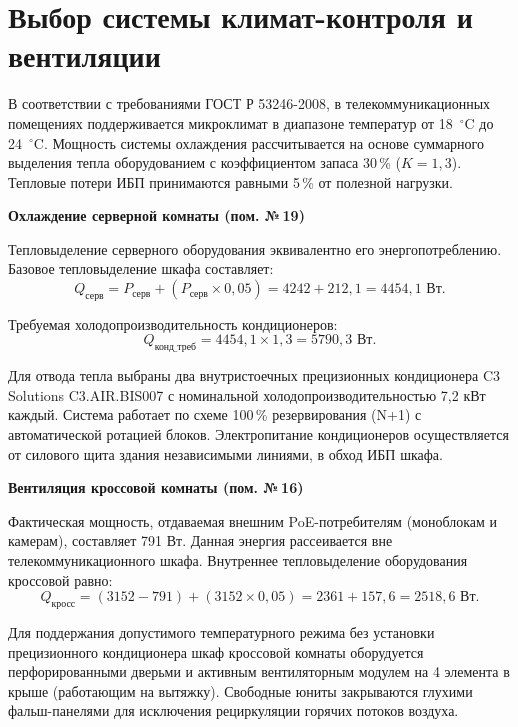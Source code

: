 \documentclass[a4paper,oneside,14pt]{extreport}
\begin{document}
\section{Выбор системы климат-контроля и вентиляции}

В соответствии с требованиями ГОСТ Р 53246-2008, в телекоммуникационных помещениях поддерживается микроклимат в диапазоне температур от 18~$^\circ$C до 24~$^\circ$C. Мощность системы охлаждения рассчитывается на основе суммарного выделения тепла оборудованием с коэффициентом запаса 30\,\% ($K = 1{,}3$). Тепловые потери ИБП принимаются равными 5\,\% от полезной нагрузки.

\textbf{Охлаждение серверной комнаты (пом. №\,19)}

Тепловыделение серверного оборудования эквивалентно его энергопотреблению. Базовое тепловыделение шкафа составляет:
\begin{equation}
    Q_{\text{серв}} = P_{\text{серв}} + (P_{\text{серв}} \times 0{,}05) = 4242 + 212{,}1 = 4454{,}1 \text{ Вт}.
\end{equation}

Требуемая холодопроизводительность кондиционеров:
\begin{equation}
    Q_{\text{конд\_треб}} = 4454{,}1 \times 1{,}3 = 5790{,}3 \text{ Вт}.
\end{equation}

Для отвода тепла выбраны два внутристоечных прецизионных кондиционера C3 Solutions C3.AIR.BIS007 с номинальной холодопроизводительностью 7{,}2 кВт каждый. Система работает по схеме 100\,\% резервирования (N+1) с автоматической ротацией блоков. Электропитание кондиционеров осуществляется от силового щита здания независимыми линиями, в обход ИБП шкафа.

\textbf{Вентиляция кроссовой комнаты (пом. №\,16)}

Фактическая мощность, отдаваемая внешним PoE-потребителям (моноблокам и камерам), составляет 791 Вт. Данная энергия рассеивается вне телекоммуникационного шкафа. 
Внутреннее тепловыделение оборудования кроссовой равно:
\begin{equation}
    Q_{\text{кросс}} = (3152 - 791) + (3152 \times 0{,}05) = 2361 + 157{,}6 = 2518{,}6 \text{ Вт}.
\end{equation}

Для поддержания допустимого температурного режима без установки прецизионного кондиционера шкаф кроссовой комнаты оборудуется перфорированными дверьми и активным вентиляторным модулем на 4 элемента в крыше (работающим на вытяжку). Свободные юниты закрываются глухими фальш-панелями для исключения рециркуляции горячих потоков воздуха.
\end{document}
